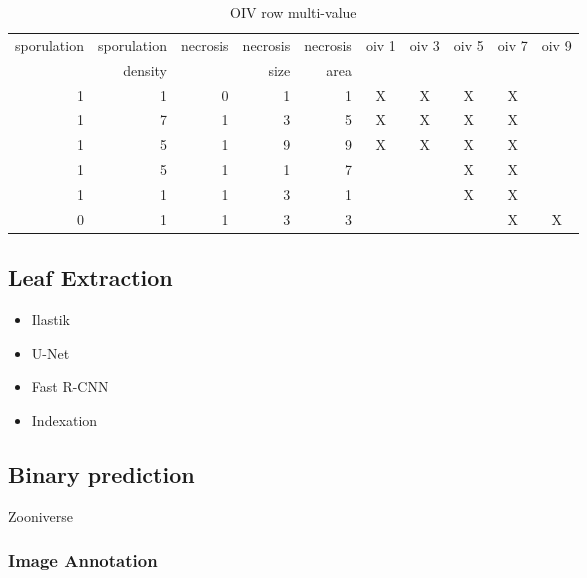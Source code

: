 \documentclass[english]{article}
\begin{document}
\begin{table}[H]
	\centering
	\caption{OIV row multi-value}\label{tab:oivconfusion}
	\begin{tabular}{rrrrrccccc}
		\toprule
		sporulation & sporulation & necrosis & necrosis & necrosis & oiv 1 & oiv 3 & oiv 5 & oiv 7 & oiv 9 \\
		{}          & density     & {}       & size     & area     & {}    & {}    & {}    & {}    & {}    \\
		\midrule
		1           & 1           & 0        & 1        & 1        & X     & X     & X     & X     &       \\
		1           & 7           & 1        & 3        & 5        & X     & X     & X     & X     &       \\
		1           & 5           & 1        & 9        & 9        & X     & X     & X     & X     &       \\
		1           & 5           & 1        & 1        & 7        &       &       & X     & X     &       \\
		1           & 1           & 1        & 3        & 1        &       &       & X     & X     &       \\
		0           & 1           & 1        & 3        & 3        &       &       &       & X     & X     \\
		\bottomrule
	\end{tabular}
\end{table}

\subsection*{Leaf Extraction}

\begin{itemize}
	\item Ilastik \parencite{bergIlastikInteractiveMachine2019}
	\item U-Net \parencite{ronnebergerUNetConvolutionalNetworks2015}
	\item Fast R-CNN \parencite{girshickFastRCNN2015}
	\item Indexation
\end{itemize}

\subsection*{Binary prediction}
Zooniverse \parencite{zooniverse}

\subsubsection*{Image Annotation}
\end{document}

